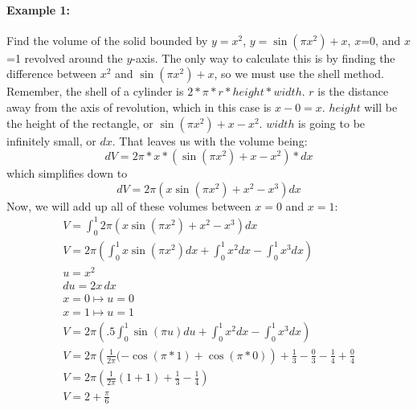 \documentclass[../revisedmain.tex]{subfiles}
\begin{document}
\paragraph{Example 1:}Find the volume of the solid bounded by $y=x^2$, $y=\sin\left(\pi x^2\right)+x$, $x$=0, and $x$=1 revolved around the $y$-axis.\newline
The only way to calculate this is by finding the difference between $x^2$ and $\sin\left(\pi x^2\right)+x$, so we must use the shell method. Remember, the shell of a cylinder is $2*\pi*r*height*width$. $r$ is the distance away from the axis of revolution, which in this case is $x-0=x$. $height$ will be the height of the rectangle, or $\sin\left(\pi x^2\right)+x-x^2$. $width$ is going to be infinitely small, or $dx$. That leaves us with the volume being:\[dV=2\pi*x*\left(\sin\left(\pi x^2\right)+x-x^2\right)*dx\]which simplifies down to\[dV=2\pi \left(x\sin\left(\pi x^2\right)+x^2-x^3\right)dx\]Now, we will add up all of these volumes between $x=0$ and $x=1$:
\begin{gather*}
	V=\int_{0}^{1}2\pi \left(x\sin(\pi x^2)+x^2-x^3\right)dx\\
	V=2\pi\left(\int_{0}^{1}x\sin(\pi x^2)dx+\int_{0}^{1}x^2dx-\int_{0}^{1}x^3dx\right)\\
	u=x^2\\
	du=2x\,dx\\
	x=0\mapsto u=0\\
	x=1\mapsto u=1\\
	V=2\pi\left(.5\int_{0}^{1}\sin(\pi u)du+\int_{0}^{1}x^2dx-\int_{0}^{1}x^3dx\right)\\
	V=2\pi\left(\frac{1}{2\pi}(-\cos(\pi*1)+\cos(\pi*0)\right)+\frac{1}{3}-\frac{0}{3}-\frac{1}{4}+\frac{0}{4}\\
	V=2\pi\left(\frac{1}{2\pi}(1+1)+\frac{1}{3}-\frac{1}{4}\right)\\
	V=2+\frac{\pi}{6}\\
\end{gather*}
\end{document}
